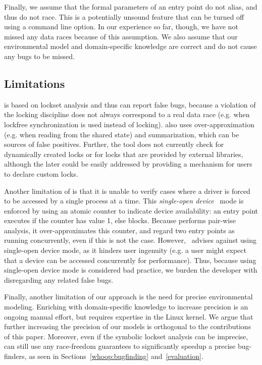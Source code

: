 Finally, we assume that the formal parameters of an entry point do not alias, and thus do not race. This is a potentially unsound feature that can be turned off using a command line option. In our experience so far, though, we have not missed any data races because of this assumption. We also assume that our environmental model and domain-specific knowledge are correct and do not cause any bugs to be missed.

\subsection{Limitations}
\label{whoop:limitations}

\whoop is based on lockset analysis and thus can report false bugs, because a violation of the locking discipline does not always correspond to a real data race (e.g. when lockfree synchronization is used instead of locking). \whoop also uses over-approximation (e.g. when reading from the shared state) and summarization, which can be sources of false positives. Further, the tool does not currently check for dynamically created locks or for locks that are provided by external libraries, although the later could be easily addressed by providing a mechanism for users to declare custom locks.

Another limitation of \whoop is that it is unable to verify cases where a driver is forced to be accessed by a single process at a time. This \emph{single-open device}~\cite{corbet2005linux} mode is enforced by using an atomic counter to indicate device availability: an entry point executes if the counter has value 1, else blocks. Because \whoop performs pair-wise analysis, it over-approximates this counter, and regard two entry points as running concurrently, even if this is not the case. However,~\cite{corbet2005linux} advises against using single-open device mode, as it hinders user ingenuity (e.g. a user might expect that a device can be accessed concurrently for performance). Thus, because using single-open device mode is considered bad practice, we burden the developer with disregarding any related false bugs.

Finally, another limitation of our approach is the need for precise environmental modeling. Enriching \whoop with domain-specific knowledge to increase precision is an ongoing manual effort, but requires expertise in the Linux kernel. We argue that further increasing the precision of our models is orthogonal to the contributions of this paper. Moreover, even if the symbolic lockset analysis can be imprecise, \whoop can still use any race-freedom guarantees to significantly speedup a precise bug-finders, as seen in Sections~\ref{whoop:bugfinding} and~\ref{evaluation}.
